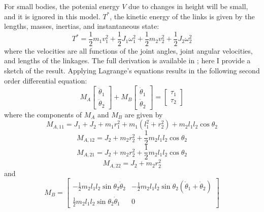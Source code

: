 \documentclass{article}
\begin{document}
	For small bodies, the potenial energy $V$ due to changes in height will be small, and it is ignored in this model.  $T^*$, the kinetic energy of the links is given by the lengths, masses, inertias, and instantaneous state:
\begin{equation}
T^* = \frac{1}{2}m_1 v_1^2 +
\frac{1}{2}J_1 \omega_1^2 +
\frac{1}{2}m_2 v_2^2 +
\frac{1}{2}J_2 \omega_2^2
\end{equation}
where the velocities are all functions of the joint angles, joint angular velocities, and lengths of the linkages.  The full derivation is available in  \citep{Baruh:2007};  here I provide a sketch of the result.  Applying Lagrange's equations results in the following second order differential equation:
\begin{equation}
M_A 
\left[ \begin{array}{c}
\ddot\theta_1 \\
\ddot\theta_2
\end{array} \right]
+ M_B 
\left[ \begin{array}{c}
\dot\theta_1 \\
\dot\theta_2
\end{array} \right]
=
\left[ \begin{array}{c}
\tau_1 \\
\tau_2
\end{array} \right]
\end{equation}
where the components of $M_A$ and $M_B$ are given by
\begin{equation}
M_{A,11} = J_1 + J_2 + m_1 r_1^2 + m_1 (l_1^2 + r_2^2) + m_2 l_1 l_2 \cos\theta_2
\end{equation}
\begin{equation}
M_{A,12} =J_2 + m_2 r_2^2 + \frac{1}{2}m_2 l_1 l_2 \cos\theta_2
\end{equation}
\begin{equation}
M_{A,21} =J_2 + m_2 r_2^2 + \frac{1}{2} m_2 l_1 l_2 \cos\theta_2
\end{equation}
\begin{equation}
M_{A,22} =J_2 + m_2 r_2^2
\end{equation}
and
\begin{equation}
M_{B} =
\left[\begin{array}{cc}
-\frac{1}{2} m_2 l_1 l_2 \sin\theta_2 \dot\theta_2 & 
-\frac{1}{2} m_2 l_1 l_2\sin\theta_2 (\dot\theta_1 + \dot\theta_2) \\
\frac{1}{2}m_2 l_1 l_2 \sin\theta_2\dot\theta_1 &
0
\end{array}\right]
\end{equation}
\end{document}
